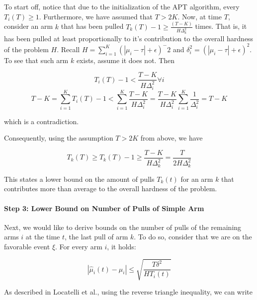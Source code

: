\documentclass[12pt,]{article}
\let\oldparagraph\paragraph
\renewcommand{\paragraph}[1]{\oldparagraph{#1}\mbox{}}
\begin{document}
To start off, notice that due to the initialization of the APT
algorithm, every \(T_i(T) \geq 1\). Furthermore, we have assumed that
\(T>2K\). Now, at time \(T\), consider an arm \(k\) that has been pulled
\(T_k(T) -1 \geq \frac{(T-K)}{H \Delta^2_k}\) times. That is, it has
been pulled at least proportionally to it's contribution to the overall
hardness of the problem \(H\). Recall
\(H = \sum_{i=1}^K(|\mu_i - \tau|+\epsilon)^-2\) and
\(\delta^2_i = (|\mu_i - \tau | + \epsilon)^2\). To see that such arm
\(k\) exists, assume it does not. Then

\begin{equation*}
T_i(T) - 1 < \frac{T-K}{H \Delta_i^2} \forall i
\end{equation*}\begin{equation*}
T- K = \sum_{i=1}^{K} T_i(T) - 1 < \sum_{i=1}^{K} \frac{T-K}{H \Delta_i^2} = \frac{T-K}{H \Delta_i^2} \sum_{i=1}^{K} \frac{1}{\Delta_i^2} = T-K
\end{equation*}

which is a contradiction.

Consequently, using the assumption \(T>2K\) from above, we have

\begin{equation*}
T_k(T) \geq T_k(T) - 1 \geq \frac{T-K}{H \Delta^2_k} = \frac{T}{2H\Delta_k^2}
\end{equation*}

This states a lower bound on the amount of pulls \(T_k(t)\) for an arm
\(k\) that contributes more than average to the overall hardness of the
problem.

\paragraph{Step 3: Lower Bound on Number of Pulls of Simple
Arm}\label{step-3-lower-bound-on-number-of-pulls-of-simple-arm}

Next, we would like to derive bounds on the number of pulls of the
remaining arms \(i\) at the time \(t\), the last pull of arm \(k\). To
do so, consider that we are on the favorable event \(\xi\). For every
arm \(i\), it holds:

\begin{equation}
|\hat{\mu}_i(t) - \mu_i | \leq \sqrt{\frac{T \delta^2}{HT_i(t)}} \label{step3_favorable_event} 
\end{equation}

As described in Locatelli et al., using the reverse triangle inequality,
we can write
\end{document}
